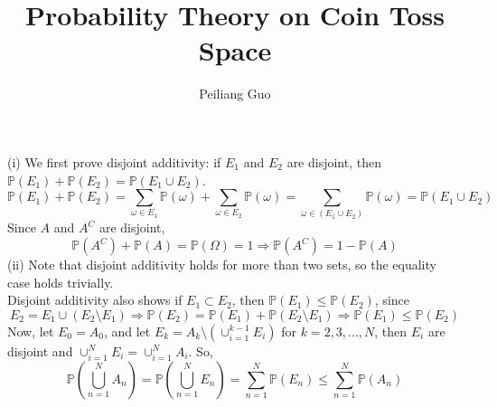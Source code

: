 \documentclass[12pt]{article}
\newenvironment{exercise}[2][Exercise]{\begin{trivlist}
		\item[\hskip \labelsep {\bfseries #1}\hskip \labelsep {\bfseries #2.}]}{\end{trivlist}}
\begin{document}
	
	\title{Probability Theory on Coin Toss Space}
	\author{Peiliang Guo}
	\maketitle
	\begin{exercise}{1}	\end{exercise}
	(i) We first prove disjoint additivity: if $E_1$ and $E_2$ are disjoint, then $\mathbb{P}(E_1)+\mathbb{P}(E_2) = \mathbb{P}(E_1\cup E_2)$.
	$$\mathbb{P}(E_1)+\mathbb{P}(E_2) = \sum_{\omega\in E_1}\mathbb{P}(\omega)+ \sum_{\omega\in E_2}\mathbb{P}(\omega)=\sum_{\omega\in(E_1\cup E_2)}\mathbb{P}(\omega)=\mathbb{P}(E_1\cup E_2)$$
Since $A$ and $A^C$ are disjoint, $$\mathbb{P}(A^C)+\mathbb{P}(A)=\mathbb{P}(\Omega) = 1 \Rightarrow \mathbb{P}(A^C) = 1-\mathbb{P}(A)$$
	(ii) Note that disjoint additivity holds for more than two sets, so the equality case holds trivially. \\
	Disjoint additivity also shows if $E_1\subset E_2$, then $\mathbb{P}(E_1)\le\mathbb{P}(E_2)$, since $$E_2 = E_1\cup(E_2\setminus E_1)\Rightarrow \mathbb{P}(E_2) = \mathbb{P}(E_1)+\mathbb{P}(E_2\setminus E_1)\Rightarrow \mathbb{P}(E_1)\le\mathbb{P}(E_2)$$
	Now, let $E_0=A_0$, and let $E_k = A_k\setminus(\cup_{i=1}^{k-1}E_i)$ for $k=2,3,...,N$, then $E_i$ are disjoint and $\cup_{i=1}^NE_i = \cup_{i=1}^N A_i$. So, 
	$$\mathbb{P}\left(\bigcup_{n=1}^N A_n\right)=\mathbb{P}\left(\bigcup_{n=1}^N E_n\right)=\sum_{n=1}^N\mathbb{P}(E_n)\le \sum_{n=1}^N\mathbb{P}(A_n)$$
	
\end{document}
